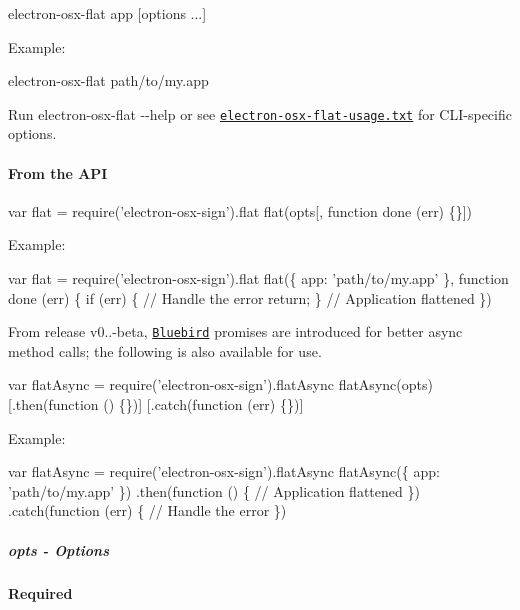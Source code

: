 \begin{DoxyCode}
electron-osx-flat app [options ...]
\end{DoxyCode}


Example\+:


\begin{DoxyCode}
electron-osx-flat path/to/my.app
\end{DoxyCode}


Run {\ttfamily electron-\/osx-\/flat -\/-\/help} or see \href{https://github.com/electron-userland/electron-osx-sign/blob/master/bin/electron-osx-flat-usage.txt}{\tt electron-\/osx-\/flat-\/usage.\+txt} for C\+L\+I-\/specific options.

\paragraph*{From the A\+PI}


\begin{DoxyCode}
var flat = require('electron-osx-sign').flat
flat(opts[, function done (err) \{\}])
\end{DoxyCode}


Example\+:


\begin{DoxyCode}
var flat = require('electron-osx-sign').flat
flat(\{
  app: 'path/to/my.app'
\}, function done (err) \{
  if (err) \{
    // Handle the error
    return;
  \}
  // Application flattened
\})
\end{DoxyCode}


From release v0..-\/beta, \href{https://github.com/petkaantonov/bluebird}{\tt Bluebird} promises are introduced for better async method calls; the following is also available for use.


\begin{DoxyCode}
var flatAsync = require('electron-osx-sign').flatAsync
flatAsync(opts)
  [.then(function () \{\})]
  [.catch(function (err) \{\})]
\end{DoxyCode}


Example\+:


\begin{DoxyCode}
var flatAsync = require('electron-osx-sign').flatAsync
flatAsync(\{
  app: 'path/to/my.app'
\})
  .then(function () \{
    // Application flattened
  \})
  .catch(function (err) \{
    // Handle the error
  \})
\end{DoxyCode}


\subparagraph*{opts -\/ Options}

{\bfseries Required}

